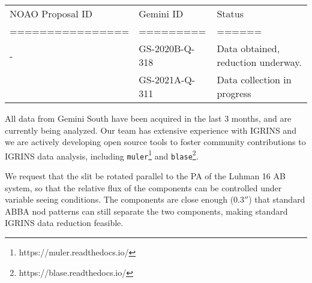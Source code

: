 \documentclass[11pt]{article}
\begin{document}
{%
%
%
\thepast
\begin{tabular}{lll}
NOAO Proposal ID & Gemini ID & Status \\
================ & ========= & ====== \\
- & GS-2020B-Q-318  & Data obtained, reduction underway. \\
 & GS-2021A-Q-311 & Data collection in progress \\
\end{tabular}
 
All data from Gemini South have been acquired in the last 3 months, and are currently being analyzed.  
Our team has extensive experience with IGRINS and we are actively developing open source tools to foster community contributions to IGRINS data analysis, including \texttt{muler}\footnote{https://muler.readthedocs.io/} and \texttt{blase}\footnote{https://blase.readthedocs.io/}.


%

\technicaldescription


We request that the slit be rotated parallel to the PA of the Luhman 16 AB system, so that the relative flux of the components can be controlled under variable seeing conditions.  The components are close enough ($0.3''$) that standard ABBA nod patterns can still separate the two components, making standard IGRINS data reduction feasible.

}
\end{document}
